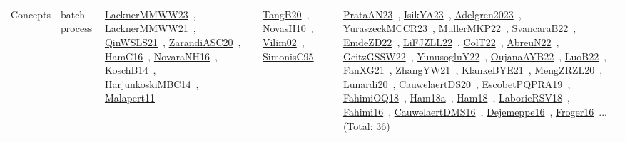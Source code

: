 {\begin{longtable}{lp{3cm}>{\raggedright\arraybackslash}p{6cm}>{\raggedright\arraybackslash}p{6cm}>{\raggedright\arraybackslash}p{8cm}}
Concepts & batch process & \href{../works/LacknerMMWW23.pdf}{LacknerMMWW23}~\cite{LacknerMMWW23}, \href{../works/LacknerMMWW21.pdf}{LacknerMMWW21}~\cite{LacknerMMWW21}, \href{../works/QinWSLS21.pdf}{QinWSLS21}~\cite{QinWSLS21}, \href{../works/ZarandiASC20.pdf}{ZarandiASC20}~\cite{ZarandiASC20}, \href{../works/HamC16.pdf}{HamC16}~\cite{HamC16}, \href{../works/NovaraNH16.pdf}{NovaraNH16}~\cite{NovaraNH16}, \href{../works/KoschB14.pdf}{KoschB14}~\cite{KoschB14}, \href{../works/HarjunkoskiMBC14.pdf}{HarjunkoskiMBC14}~\cite{HarjunkoskiMBC14}, \href{../works/Malapert11.pdf}{Malapert11}~\cite{Malapert11} & \href{../works/TangB20.pdf}{TangB20}~\cite{TangB20}, \href{../works/NovasH10.pdf}{NovasH10}~\cite{NovasH10}, \href{../works/Vilim02.pdf}{Vilim02}~\cite{Vilim02}, \href{../works/SimonisC95.pdf}{SimonisC95}~\cite{SimonisC95} & \href{../works/PrataAN23.pdf}{PrataAN23}~\cite{PrataAN23}, \href{../works/IsikYA23.pdf}{IsikYA23}~\cite{IsikYA23}, \href{../works/Adelgren2023.pdf}{Adelgren2023}~\cite{Adelgren2023}, \href{../works/YuraszeckMCCR23.pdf}{YuraszeckMCCR23}~\cite{YuraszeckMCCR23}, \href{../works/MullerMKP22.pdf}{MullerMKP22}~\cite{MullerMKP22}, \href{../works/SvancaraB22.pdf}{SvancaraB22}~\cite{SvancaraB22}, \href{../works/EmdeZD22.pdf}{EmdeZD22}~\cite{EmdeZD22}, \href{../works/LiFJZLL22.pdf}{LiFJZLL22}~\cite{LiFJZLL22}, \href{../works/ColT22.pdf}{ColT22}~\cite{ColT22}, \href{../works/AbreuN22.pdf}{AbreuN22}~\cite{AbreuN22}, \href{../works/GeitzGSSW22.pdf}{GeitzGSSW22}~\cite{GeitzGSSW22}, \href{../works/YunusogluY22.pdf}{YunusogluY22}~\cite{YunusogluY22}, \href{../works/OujanaAYB22.pdf}{OujanaAYB22}~\cite{OujanaAYB22}, \href{../works/LuoB22.pdf}{LuoB22}~\cite{LuoB22}, \href{../works/FanXG21.pdf}{FanXG21}~\cite{FanXG21}, \href{../works/ZhangYW21.pdf}{ZhangYW21}~\cite{ZhangYW21}, \href{../works/KlankeBYE21.pdf}{KlankeBYE21}~\cite{KlankeBYE21}, \href{../works/MengZRZL20.pdf}{MengZRZL20}~\cite{MengZRZL20}, \href{../works/Lunardi20.pdf}{Lunardi20}~\cite{Lunardi20}, \href{../works/CauwelaertDS20.pdf}{CauwelaertDS20}~\cite{CauwelaertDS20}, \href{../works/EscobetPQPRA19.pdf}{EscobetPQPRA19}~\cite{EscobetPQPRA19}, \href{../works/FahimiOQ18.pdf}{FahimiOQ18}~\cite{FahimiOQ18}, \href{../works/Ham18a.pdf}{Ham18a}~\cite{Ham18a}, \href{../works/Ham18.pdf}{Ham18}~\cite{Ham18}, \href{../works/LaborieRSV18.pdf}{LaborieRSV18}~\cite{LaborieRSV18}, \href{../works/Fahimi16.pdf}{Fahimi16}~\cite{Fahimi16}, \href{../works/CauwelaertDMS16.pdf}{CauwelaertDMS16}~\cite{CauwelaertDMS16}, \href{../works/Dejemeppe16.pdf}{Dejemeppe16}~\cite{Dejemeppe16}, \href{../works/Froger16.pdf}{Froger16}~\cite{Froger16}... (Total: 36)\\

\end{longtable}}
